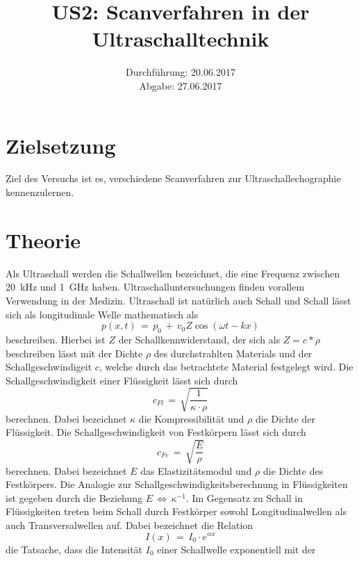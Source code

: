 \documentclass[
  bibliography=totoc,     %
  captions=tableheading,  %
  titlepage=firstiscover, %
]{scrartcl}
\title{US2: Scanverfahren in der Ultraschalltechnik}
\author{
  Simon Schulte
  \texorpdfstring{
    \\
    \href{mailto:simon.schulte@udo.edu}{simon.schulte@udo.edu}
  }{}
  \texorpdfstring{\and}{, }
  Tim Sedlaczek
  \texorpdfstring{
    \\
    \href{mailto:tim.sedlaczek@udo.edu}{tim.sedlaczek@udo.edu}
  }{}
}
\date{Durchführung: 20.06.2017\\
      Abgabe: 27.06.2017}
\begin{document}
\maketitle
\thispagestyle{empty}
\tableofcontents
\newpage
\setcounter{page}{1}
\section{Zielsetzung}
\label{sec:zielsetzung}
Ziel des Versuchs ist es, verschiedene Scanverfahren zur
Ultraschallechographie kennenzulernen.
\section{Theorie}
\label{sec:theorie}
Als Ultraschall werden die Schallwellen bezeichnet, die eine Frequenz zwischen
\SI{20}{\kilo\hertz} und \SI{1}{\giga\hertz} haben. Ultraschalluntersuchungen
finden vorallem Verwendung in der Medizin. Ultraschall ist natürlich auch
Schall und Schall lässt sich als longitudinale Welle mathematisch als
\begin{equation}
  p(x,t)\,=\,p_0\,+\,v_0 Z \cos(\omega t-kx)
\end{equation}
beschreiben. Hierbei ist $Z$ der Schallkennwiderstand, der sich als $Z=c*\rho$
beschreiben lässt mit der Dichte $\rho$ des durchstrahlten Materials und der
Schallgeschwindigeit $c$, welche durch das betrachtete Material festgelegt wird.
Die Schallgeschwindigkeit einer Flüssigkeit lässt sich durch
\begin{equation}
  c_{Fl}\,=\,\sqrt{\frac{1}{\kappa \cdot \rho}}
  \label{eqn:schallspeed}
\end{equation}
berechnen. Dabei bezeichnet $\kappa$ die Kompressibilität und $\rho$ die Dichte
der Flüssigkeit. Die Schallgeschwindigkeit von Festkörpern lässt sich durch
\begin{equation}
  c_{Fe}\,=\,\sqrt{\frac{E}{\rho}}
  \label{eqn:festkörper}
\end{equation}
berechnen. Dabei bezeichnet $E$ das Elastizitätsmodul und $\rho$ die Dichte des
Festkörpers. Die Analogie zur Schallgeschwindigkeitsberechnung in Flüssigkeiten
ist gegeben durch die Beziehung $E\,\iff \, \kappa^{-1}$. Im Gegensatz zu
Schall in Flüssigkeiten treten beim Schall durch Festkörper sowohl
Longitudinalwellen als auch Transversalwellen auf.
Dabei bezeichnet die Relation
\begin{equation}
  I(x)\,=\,I_0 \cdot e^{\alpha x}
  \label{eqn:intensität}
\end{equation}
die Tatsache, dass die Intensität $I_0$ einer Schallwelle exponentiell mit der
\end{document}
